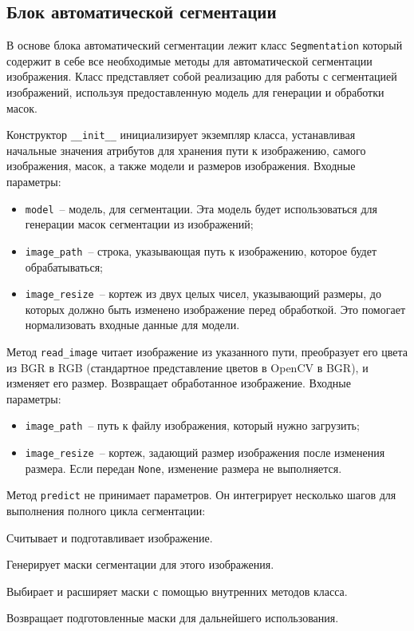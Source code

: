 \subsection{Блок автоматической сегментации}

В основе блока автоматический сегментации лежит класс \lstinline{Segmentation} который содержит в себе все необходимые методы для автоматической сегментации изображения. Класс представляет собой реализацию для работы с сегментацией изображений, используя предоставленную модель для генерации и обработки масок.

Конструктор \lstinline{__init__} инициализирует экземпляр класса, устанавливая начальные значения атрибутов для хранения пути к изображению, самого изображения, масок, а также модели и размеров изображения. Входные параметры:

\begin{itemize}
    \item \lstinline{model}~-- модель, для сегментации. Эта модель будет использоваться для генерации масок сегментации из изображений;
    \item \lstinline{image_path}~-- строка, указывающая путь к изображению, которое будет обрабатываться;
    \item \lstinline{image_resize}~-- кортеж из двух целых чисел, указывающий размеры, до которых должно быть изменено изображение перед обработкой. Это помогает нормализовать входные данные для модели.
\end{itemize}

Метод \lstinline{read_image} читает изображение из указанного пути, преобразует его цвета из BGR в RGB (стандартное представление цветов в OpenCV в BGR), и изменяет его размер. Возвращает обработанное изображение. Входные параметры:

\begin{itemize}
    \item \lstinline{image_path}~-- путь к файлу изображения, который нужно загрузить;
    \item \lstinline{image_resize}~-- кортеж, задающий размер изображения после изменения размера. Если передан \lstinline{None}, изменение размера не выполняется.
\end{itemize}

Метод \lstinline{predict} не принимает параметров. Он интегрирует несколько шагов для выполнения полного цикла сегментации:

\begin{enumerate_num}
    \item Считывает и подготавливает изображение.
    \item Генерирует маски сегментации для этого изображения.
    \item Выбирает и расширяет маски с помощью внутренних методов класса.
    \item Возвращает подготовленные маски для дальнейшего использования.
\end{enumerate_num}

